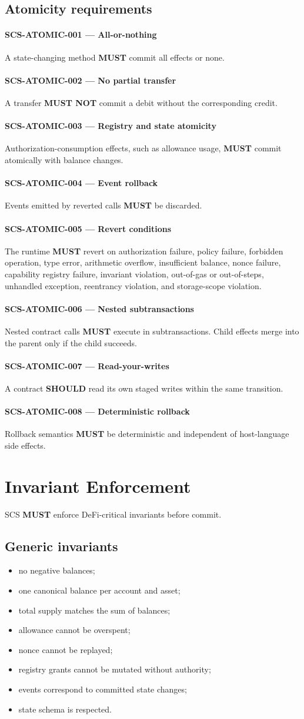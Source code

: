 \documentclass[11pt]{article}
\newcommand{\SCS}{\textsc{SCS}}
\newcommand{\MUST}{\textbf{MUST}}
\newcommand{\MUSTNOT}{\textbf{MUST NOT}}
\newcommand{\SHOULD}{\textbf{SHOULD}}
\newcommand{\req}[2]{\paragraph{#1}#2\par}
\begin{document}
\subsection{Atomicity requirements}

\req{SCS-ATOMIC-001 --- All-or-nothing}{A state-changing method \MUST{} commit all effects or none.}

\req{SCS-ATOMIC-002 --- No partial transfer}{A transfer \MUSTNOT{} commit a debit without the corresponding credit.}

\req{SCS-ATOMIC-003 --- Registry and state atomicity}{Authorization-consumption effects, such as allowance usage, \MUST{} commit atomically with balance changes.}

\req{SCS-ATOMIC-004 --- Event rollback}{Events emitted by reverted calls \MUST{} be discarded.}

\req{SCS-ATOMIC-005 --- Revert conditions}{The runtime \MUST{} revert on authorization failure, policy failure, forbidden operation, type error, arithmetic overflow, insufficient balance, nonce failure, capability registry failure, invariant violation, out-of-gas or out-of-steps, unhandled exception, reentrancy violation, and storage-scope violation.}

\req{SCS-ATOMIC-006 --- Nested subtransactions}{Nested contract calls \MUST{} execute in subtransactions. Child effects merge into the parent only if the child succeeds.}

\req{SCS-ATOMIC-007 --- Read-your-writes}{A contract \SHOULD{} read its own staged writes within the same transition.}

\req{SCS-ATOMIC-008 --- Deterministic rollback}{Rollback semantics \MUST{} be deterministic and independent of host-language side effects.}



\section{Invariant Enforcement}

\SCS{} \MUST{} enforce DeFi-critical invariants before commit.

\subsection{Generic invariants}

\begin{itemize}
  \item no negative balances;
  \item one canonical balance per account and asset;
  \item total supply matches the sum of balances;
  \item allowance cannot be overspent;
  \item nonce cannot be replayed;
  \item registry grants cannot be mutated without authority;
  \item events correspond to committed state changes;
  \item state schema is respected.
\end{itemize}
\end{document}

